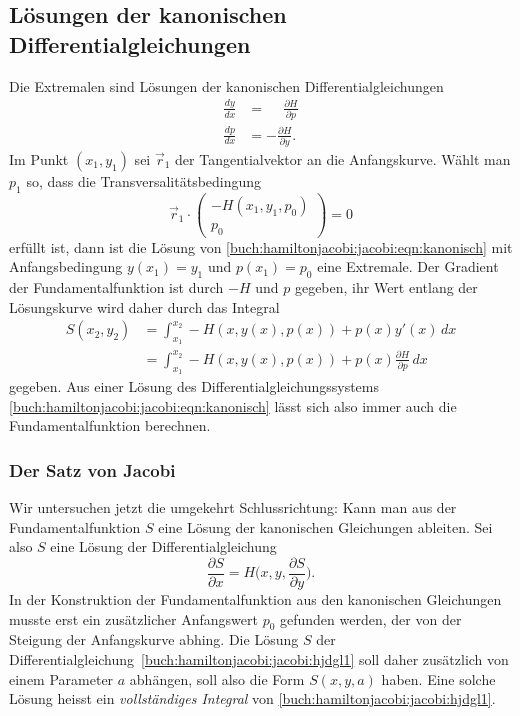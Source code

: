 %
%
\subsection{Lösungen der kanonischen Differentialgleichungen}
Die Extremalen sind Lösungen der kanonischen Differentialgleichungen
\begin{equation}
\begin{aligned}
\frac{dy}{dx}&=\phantom{-}\frac{\partial H}{\partial p}
\\
\frac{dp}{dx}&=-\frac{\partial H}{\partial y}.
\end{aligned}
\label{buch:hamiltonjacobi:jacobi:eqn:kanonisch}
\end{equation}
Im Punkt $(x_1,y_1)$ sei $\vec{r}_1$ der Tangentialvektor an die
Anfangskurve.
Wählt man $p_1$ so, dass die Transversalitätsbedingung
\[
\vec{r}_1
\cdot
\begin{pmatrix}
-H(x_1,y_1,p_0)\\
p_0
\end{pmatrix}
=
0
\]
erfüllt ist, dann ist die Lösung von
\eqref{buch:hamiltonjacobi:jacobi:eqn:kanonisch}
mit Anfangsbedingung $y(x_1)=y_1$ und $p(x_1)=p_0$ eine Extremale.
Der Gradient der Fundamentalfunktion ist durch $-H$ und $p$ gegeben,
ihr Wert entlang der Lösungskurve wird daher durch das Integral
\begin{align*}
S(x_2,y_2)
&=
\int_{x_1}^{x_2}
-H(x,y(x),p(x))
+
p(x) y'(x)
\,dx
\\
&=
\int_{x_1}^{x_2}
-H(x,y(x),p(x))
+
p(x)\frac{\partial H}{\partial p}
\,dx
\end{align*}
gegeben.
Aus einer Lösung des Differentialgleichungssystems
\eqref{buch:hamiltonjacobi:jacobi:eqn:kanonisch}
lässt sich also immer auch die Fundamentalfunktion berechnen.

%
%
\subsubsection{Der Satz von Jacobi}
Wir untersuchen jetzt die umgekehrt Schlussrichtung: Kann man aus
der Fundamentalfunktion $S$ eine Lösung der kanonischen Gleichungen 
ableiten.
Sei also $S$ eine Lösung der Differentialgleichung
\begin{equation}
\frac{\partial S}{\partial x}
=
H\biggl(x,y,\frac{\partial S}{\partial y}\biggr).
\label{buch:hamiltonjacobi:jacobi:hjdgl1}
\end{equation}
In der Konstruktion der Fundamentalfunktion aus den kanonischen Gleichungen
musste erst ein zusätzlicher Anfangswert $p_0$ gefunden werden,
der von der Steigung der Anfangskurve abhing.
Die Lösung $S$ der
Differentialgleichung~\eqref{buch:hamiltonjacobi:jacobi:hjdgl1}
soll daher zusätzlich von einem Parameter $a$ abhängen, soll also
die Form
\(
S(x,y,a)
\)
haben.
Eine solche Lösung heisst ein {\em vollständiges Integral} von
\eqref{buch:hamiltonjacobi:jacobi:hjdgl1}.

